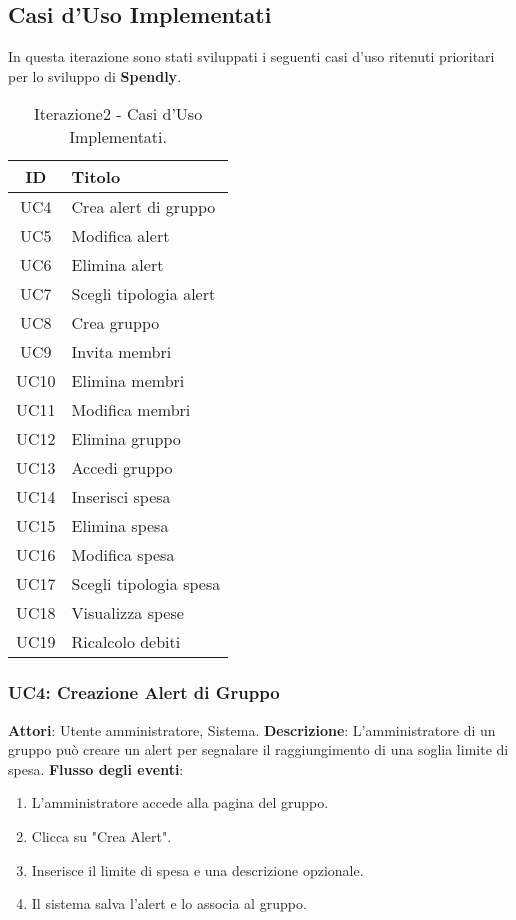 \subsection{Casi d'Uso Implementati }

In questa iterazione sono stati sviluppati i seguenti casi d’uso ritenuti prioritari per lo sviluppo di \textbf{Spendly}.

\begin{table}[h]
    \centering
    \begin{tabular}{|c|l|}
    \hline
    \textbf{ID} & \textbf{Titolo} \\ \hline
    UC4  & Crea alert di gruppo \\ \hline
    UC5  & Modifica alert \\ \hline
    UC6  & Elimina alert \\ \hline
    UC7  & Scegli tipologia alert \\ \hline
    UC8  & Crea gruppo \\ \hline
    UC9  & Invita membri \\ \hline
    UC10 & Elimina membri \\ \hline
    UC11 & Modifica membri \\ \hline
    UC12 & Elimina gruppo \\ \hline
    UC13 & Accedi gruppo \\ \hline
    UC14 & Inserisci spesa \\ \hline
    UC15 & Elimina spesa \\ \hline
    UC16 & Modifica spesa \\ \hline
    UC17 & Scegli tipologia spesa \\ \hline
    UC18 & Visualizza spese \\ \hline
    UC19 & Ricalcolo debiti \\ \hline
    \end{tabular}
    \caption{Iterazione2 - Casi d'Uso Implementati.}
\end{table}

\subsubsection{UC4: Creazione Alert di Gruppo}
\textbf{Attori}: Utente amministratore, Sistema.
\newline
\newline
\textbf{Descrizione}: L’amministratore di un gruppo può creare un alert per segnalare il raggiungimento di una soglia limite di spesa.
\newline
\newline
\textbf{Flusso degli eventi}:
\begin{enumerate}
    \item L’amministratore accede alla pagina del gruppo.
    \item Clicca su "Crea Alert".
    \item Inserisce il limite di spesa e una descrizione opzionale.
    \item Il sistema salva l’alert e lo associa al gruppo.
\end{enumerate}

